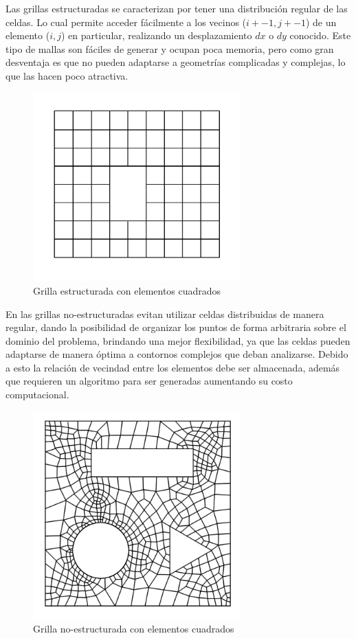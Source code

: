 \documentclass[a4paper,10pt, oneside]{book}
\begin{document}
Las grillas estructuradas se caracterizan por tener una distribución regular de las celdas. Lo cual permite acceder fácilmente a los vecinos ($i+-1,j+-1$) de un elemento ($i,j$) en particular, realizando un desplazamiento $dx$ o $dy$ conocido. Este tipo de mallas son fáciles de generar y ocupan poca memoria, pero como gran desventaja es que no pueden adaptarse a geometrías complicadas y complejas, lo que las hacen poco atractiva. 
\begin{figure}[h!]
	\centering
	\includegraphics[width=8cm]{Img/3-7}
	\caption{Grilla estructurada con elementos cuadrados}
	\label{img:3-6}
\end{figure}

En las grillas no-estructuradas evitan utilizar celdas distribuidas de manera regular, dando la posibilidad de organizar los puntos de forma arbitraria sobre el dominio del problema, brindando una mejor flexibilidad, ya que las celdas pueden adaptarse de manera óptima a contornos complejos que deban analizarse. Debido a esto la relación de vecindad entre los elementos debe ser almacenada, además que requieren un algoritmo para ser generadas aumentando su costo computacional.
\begin{figure}[h!]
	\centering
	\includegraphics[width=8cm]{Img/3-8}
	\caption{Grilla no-estructurada con elementos cuadrados}
	\label{img:3-7}
\end{figure}
\end{document}
